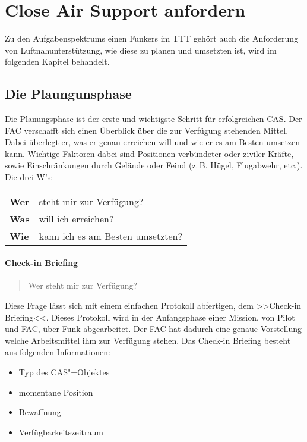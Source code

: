 \pagebreak
\section{Close Air Support anfordern}
Zu den Aufgabenspektrums einen Funkers im TTT gehört auch die Anforderung von Luftnahunterstützung, wie diese zu planen und umsetzten ist, wird im folgenden Kapitel behandelt.
\subsection{Die Plaungunsphase}
Die Planungsphase ist der erste und wichtigste Schritt für erfolgreichen CAS. Der FAC verschafft sich einen Überblick über die zur Verfügung stehenden Mittel. Dabei überlegt er, was er genau erreichen will und wie er es am Besten umsetzen kann. Wichtige Faktoren dabei sind Positionen verbündeter oder ziviler Kräfte, sowie Einschränkungen durch Gelände oder Feind (z.\,B. Hügel, Flugabwehr, etc.).\\
Die drei W's:\\
\begin{tabular}{ll}
\textbf{Wer} &  steht mir zur Verfügung?\\ 
\textbf{Was} &  will ich erreichen?\\ 
\textbf{Wie} &  kann ich es am Besten umsetzten?\\ 
\end{tabular} 

\paragraph*{Check-in Briefing}
\begin{quote}
	\glqq Wer steht mir zur Verfügung?\grqq
\end{quote}
Diese Frage lässt sich mit einem einfachen Protokoll abfertigen, dem >>Check-in Briefing<<. Dieses Protokoll wird in der Anfangsphase einer Mission, von Pilot und FAC, über Funk abgearbeitet. Der FAC hat dadurch eine genaue Vorstellung welche Arbeitsmittel ihm zur Verfügung stehen. Das Check-in Briefing besteht aus folgenden Informationen:
\begin{itemize}
	\item Typ des CAS"=Objektes
	\item momentane Position
	\item Bewaffnung
	\item Verfügbarkeitszeitraum
\end{itemize}

